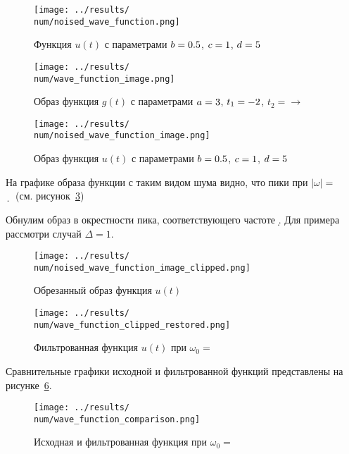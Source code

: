 \begin{figure}[ht!]
    \centering
    \texttt{[image: ../results/\\num/noised\_wave\_function.png]}
    \caption{Функция $u(t)$ с параметрами $b = 0.5$, $c = 1$, $d = 5$}
    \label{fig:noised_wave_function_\num}
\end{figure}

\begin{figure}[ht!]
    \centering
    \texttt{[image: ../results/\\num/wave\_function\_image.png]}
    \caption{Образ функция $g(t)$ с параметрами $a = 3$, $t_1 = -2$, $t_2 = \to$}
    \label{fig:wave_function_image_\num}
\end{figure}

\begin{figure}[ht!]
    \centering
    \texttt{[image: ../results/\\num/noised\_wave\_function\_image.png]}
    \caption{Образ функция $u(t)$ с параметрами $b = 0.5$, $c = 1$, $d = 5$}
    \label{fig:noised_wave_function_image_\num}
\end{figure}

\FloatBarrier
На графике образа функции с таким видом шума видно, что пики при $|\omega| = $~\d~(см. рисунок~\ref{fig:noised_wave_function_image_\num})

Обнулим образ в окрестности пика, соответствующего частоте \d. Для примера рассмотри случай $\Delta = 1$.
\begin{figure}[ht!]
    \centering
    \texttt{[image: ../results/\\num/noised\_wave\_function\_image\_clipped.png]}
    \caption{Обрезанный образ функция $u(t)$}
    \label{fig:noised_wave_function_image_clipped_\num}
\end{figure}

\begin{figure}[ht!]
    \centering
    \texttt{[image: ../results/\\num/wave\_function\_clipped\_restored.png]}
    \caption{Фильтрованная функция $u(t)$ при $\omega_0=$~\imageclip}
    \label{fig:wave_function_clipped_restored_\num}
\end{figure}

Сравнительные графики исходной и фильтрованной функций представлены на рисунке~\ref{fig:wave_function_comparison_\num}. 
\begin{figure}[ht!]
    \centering
    \texttt{[image: ../results/\\num/wave\_function\_comparison.png]}
    \caption{Исходная и фильтрованная функция при $\omega_0=$~\imageclip}
    \label{fig:wave_function_comparison_\num}
\end{figure}

